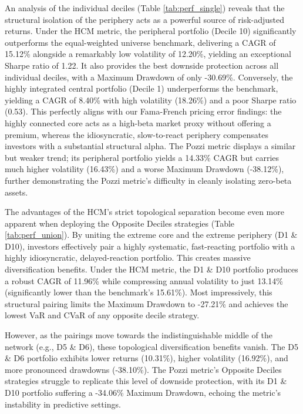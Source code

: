 \documentclass[fleqn]{rbfin}
\begin{document}
An analysis of the individual deciles (Table \ref{tab:perf_single}) reveals that the structural isolation of the periphery acts as a powerful source of risk-adjusted returns. Under the HCM metric, the peripheral portfolio (Decile 10) significantly outperforms the equal-weighted universe benchmark, delivering a CAGR of 15.12\% alongside a remarkably low volatility of 12.20\%, yielding an exceptional Sharpe ratio of 1.22. It also provides the best downside protection across all individual deciles, with a Maximum Drawdown of only -30.69\%. Conversely, the highly integrated central portfolio (Decile 1) underperforms the benchmark, yielding a CAGR of 8.40\% with high volatility (18.26\%) and a poor Sharpe ratio (0.53). This perfectly aligns with our Fama-French pricing error findings: the highly connected core acts as a high-beta market proxy without offering a premium, whereas the idiosyncratic, slow-to-react periphery compensates investors with a substantial structural alpha. The Pozzi metric displays a similar but weaker trend; its peripheral portfolio yields a 14.33\% CAGR but carries much higher volatility (16.43\%) and a worse Maximum Drawdown (-38.12\%), further demonstrating the Pozzi metric's difficulty in cleanly isolating zero-beta assets.

The advantages of the HCM's strict topological separation become even more apparent when deploying the Opposite Deciles strategies (Table \ref{tab:perf_union}). By uniting the extreme core and the extreme periphery (D1 \& D10), investors effectively pair a highly systematic, fast-reacting portfolio with a highly idiosyncratic, delayed-reaction portfolio. This creates massive diversification benefits. Under the HCM metric, the D1 \& D10 portfolio produces a robust CAGR of 11.96\% while compressing annual volatility to just 13.14\% (significantly lower than the benchmark's 15.61\%). Most impressively, this structural pairing limits the Maximum Drawdown to -27.21\% and achieves the lowest VaR and CVaR of any opposite decile strategy. 

However, as the pairings move towards the indistinguishable middle of the network (e.g., D5 \& D6), these topological diversification benefits vanish. The D5 \& D6 portfolio exhibits lower returns (10.31\%), higher volatility (16.92\%), and more pronounced drawdowns (-38.10\%). The Pozzi metric's Opposite Deciles strategies struggle to replicate this level of downside protection, with its D1 \& D10 portfolio suffering a -34.06\% Maximum Drawdown, echoing the metric's instability in predictive settings.
\end{document}
